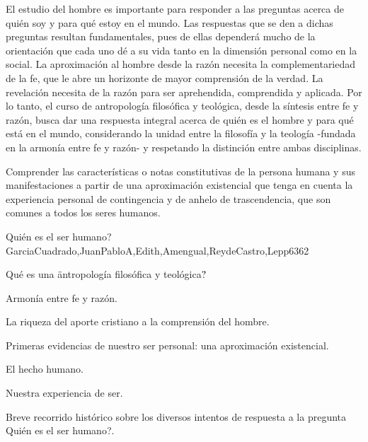 \begin{syllabus}


\begin{justification}
El estudio del hombre es importante para responder a las preguntas acerca de quién soy y para qué estoy en el mundo. Las respuestas que se den a dichas preguntas resultan fundamentales, pues de ellas dependerá mucho de la orientación que cada uno dé a su vida tanto en la dimensión personal como en la social. La aproximación al hombre desde la razón necesita la complementariedad de la fe, que le abre un horizonte de mayor comprensión de la verdad. La revelación necesita de la razón para ser aprehendida, comprendida y aplicada. Por lo tanto, el curso de antropología filosófica y teológica, desde la síntesis entre fe y razón, busca dar una respuesta integral acerca de quién es el hombre y para qué está en el mundo, considerando la unidad entre la filosofía y la teología -fundada en la armonía entre fe y razón- y respetando la distinción entre ambas disciplinas.
\end{justification}

\begin{goals}
\item Comprender las características o notas constitutivas de la persona humana y sus manifestaciones a partir de una aproximación existencial que tenga en cuenta la experiencia personal de contingencia y de anhelo de trascendencia, que son comunes a todos los seres humanos.
\end{goals}

\begin{outcomes}
\end{outcomes}

\begin{unit}{Quién es el ser humano?}{GarciaCuadrado,JuanPabloA,Edith,Amengual,ReydeCastro,Lepp63}{6}{2}
\begin{topics}
 		\item Qué es una \"antropología filosófica y teológica\"?
 		\item Armonía entre fe y razón.
 		\item La riqueza del aporte cristiano a la comprensión del hombre.
 		\item Primeras evidencias de nuestro ser personal: una aproximación existencial.
 		\item El hecho humano.
 		\item Nuestra experiencia de ser.
 		\item Breve recorrido histórico sobre los diversos intentos de respuesta a la pregunta Quién es el ser humano?. 
\end{topics}


\end{unit}
\end{syllabus}
